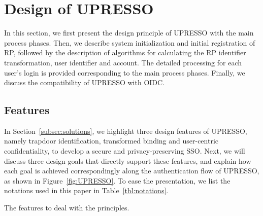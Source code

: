 \section{Design of UPRESSO}
\label{sec:UPRESSO}
In this section, we first present the design principle of UPRESSO with the main process phases. Then, we describe system initialization and initial registration of RP, followed by the description of algorithms for calculating the RP identifier transformation, user identifier and account. The detailed processing for each user's login is provided corresponding to the main process phases. Finally, we discuss the compatibility of UPRESSO with OIDC.

\subsection{Features}
\label{subsec:overview}

In Section~\ref{subsec:solutions}, we highlight three design features of UPRESSO, namely trapdoor identification, transformed binding and user-centric confidentiality, to develop a secure and privacy-preserving SSO.
Next, we will discuss three design goals that directly support these features, and explain how each goal is achieved correspondingly along the authentication flow of UPRESSO, as shown in Figure~\ref{fig:UPRESSO}.
To ease the presentation, we list the notations used in this paper in Table~\ref{tbl:notations}.

{\color{red} The features to deal with the principles.}

